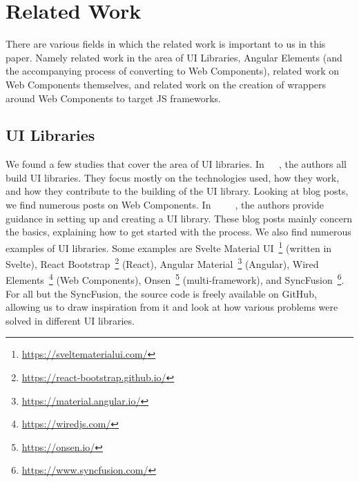 \section{Related Work}\label{sec:related-work}

There are various fields in which the related work is important to us in this paper. Namely related work in the area of UI Libraries, Angular Elements (and the accompanying process of converting to Web Components), related work on Web Components themselves, and related work on the creation of wrappers around Web Components to target JS frameworks.

\subsection{UI Libraries}
We found a few studies that cover the area of UI libraries. In~\cite{ky2019ui}~\cite{annala2017documentation}~\cite{mrazcomponent}, the authors all build UI libraries. They focus mostly on the technologies used, how they work, and how they contribute to the building of the UI library. Looking at blog posts, we find numerous posts on Web Components. In~\cite{dobry_2017}~\cite{ella_2019}~\cite{pscheid_2020}~\cite{saring_2020_1}~\cite{saring_2020_2}, the authors provide guidance in setting up and creating a UI library. These blog posts mainly concern the basics, explaining how to get started with the process. We also find numerous examples of UI libraries. Some examples are Svelte Material UI~\footnote{\url{https://sveltematerialui.com/}} (written in Svelte), React Bootstrap~\footnote{\url{https://react-bootstrap.github.io/}} (React), Angular Material~\footnote{\url{https://material.angular.io/}} (Angular), Wired Elements~\footnote{\url{https://wiredjs.com/}} (Web Components), Onsen~\footnote{\url{https://onsen.io/}} (multi-framework), and SyncFusion~\footnote{\url{https://www.syncfusion.com/}}. For all but the SyncFusion, the source code is freely available on GitHub, allowing us to draw inspiration from it and look at how various problems were solved in different UI libraries.

